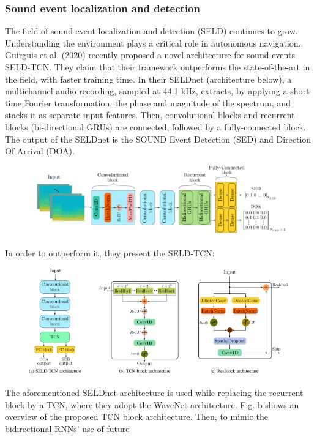 \subsubsection{Sound event localization and detection}
The field of sound event localization and detection (SELD) continues to grow. Understanding the environment plays a critical role in autonomous navigation. Guirguis et al. (2020) recently proposed a novel architecture for sound events SELD-TCN. They claim that their framework outperforms the state-of-the-art in the field, with faster training time. In their SELDnet (architecture below), a multichannel audio recording, sampled at 44.1 kHz, extracts, by applying a short-time Fourier transformation, the phase and magnitude of the spectrum, and stacks it as separate input features. Then, convolutional blocks and recurrent blocks (bi-directional GRUs) are connected, followed by a fully-connected block. The output of the SELDnet is the SOUND Event Detection (SED) and Direction Of Arrival (DOA).
\begin{figure}[h]
    \includegraphics[width=\textwidth]{../Figures/ch_3_8_sound_1.png}
\end{figure}
In order to outperform it, they present the SELD-TCN:
\begin{figure}[h]
    \includegraphics[width=\textwidth]{../Figures/ch_3_9_sound_2.png}
\end{figure}
The aforementioned SELDnet architecture is used while replacing the recurrent block by a TCN, where they adopt the WaveNet architecture. Fig. b shows an overview of the proposed TCN block architecture. Then, to mimic the bidirectional RNNs’ use of future
